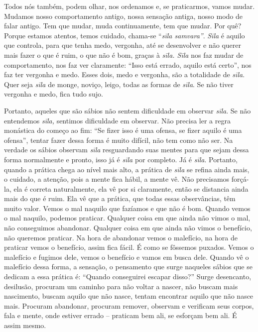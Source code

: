 Todos nós também, podem olhar, nos ordenamos e, se praticarmos,
vamos mudar. Mudamos nosso comportamento antigo, nossa sensação antiga,
nosso modo de falar antigo. Tem que mudar, muda continuamente, tem que
mudar. Por quê? Porque estamos atentos, temos cuidado, chama-se
“\textit{sīla samvara”}. \textit{Sīla }é aquilo que controla,
para que tenha medo, vergonha, até se desenvolver e não querer mais
fazer o que é ruim, o que não é bom, graças à \textit{sīla. Sīla}
nos faz mudar de comportamento, nos faz ver claramente: “Isso está
errado, aquilo está certo”, nos faz ter vergonha e medo. Esses dois,
medo e vergonha, são a totalidade de \textit{sīla}. Quer seja
\textit{sīla }de monge, noviço, leigo, todas as formas de
\textit{sīla}. Se não tiver vergonha e medo, fica tudo sujo. 

Portanto, aqueles que são sábios não sentem dificuldade em observar
\textit{sīla}. Se não entendemos \textit{sīla,} sentimos
dificuldade em observar. Não precisa ler a regra monástica do começo ao
fim: “Se fizer isso é uma ofensa, se fizer aquilo é uma ofensa”, tentar
fazer dessa forma é muito difícil, não tem como não ser. Na verdade os
sábios observam \textit{sīla} resguardando suas mentes para que
sejam dessa forma normalmente e pronto, isso já é \textit{sīla} por
completo. Já é \textit{sīla}. Portanto, quando a prática chega ao
nível mais alto, a prática de \textit{sīla} se refina ainda mais, o
cuidado, a atenção, pois a mente fica hábil, a mente vê. Não precisamos
forçá-la, ela é correta naturalmente, ela vê por si claramente, então
se distancia ainda mais do que é ruim. Ela vê que a prática, que todas
essas observâncias, têm muito valor. Vemos o mal naquilo que fazíamos e
que não é bom. Quando vemos o mal naquilo, podemos praticar. Qualquer
coisa em que ainda não vimos o mal, não conseguimos abandonar. Qualquer
coisa em que ainda não vimos o benefício, não queremos praticar. Na
hora de abandonar vemos o malefício, na hora de praticar vemos o
benefício, assim fica fácil. É como se fôssemos puxados. Vemos o
malefício e fugimos dele, vemos o benefício e vamos em busca dele.
Quando vê o malefício dessa forma, a sensação, o pensamento que surge
naqueles sábios que se dedicam a essa prática é: “Quando conseguirei
escapar disso?” Surge desencanto, desilusão, procuram um caminho para
não voltar a nascer, não buscam mais nascimento, buscam aquilo que não
nasce, tentam encontrar aquilo que não nasce mais. Procuram abandonar,
procuram remover, observam e verificam seus corpos, fala e mente, onde
estiver errado – praticam bem ali, se esforçam bem ali. É assim mesmo. 

